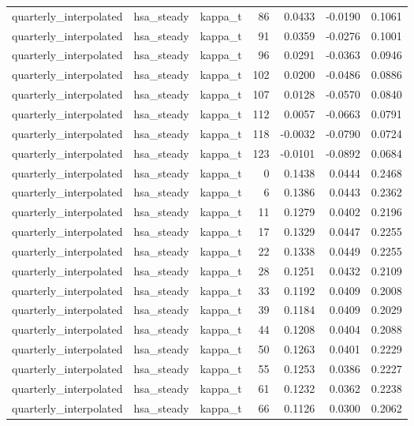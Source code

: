 \begin{tabular}{lllrrrr}
quarterly\_interpolated & hsa\_steady & kappa\_t & 86 & 0.0433 & -0.0190 & 0.1061 \\
quarterly\_interpolated & hsa\_steady & kappa\_t & 91 & 0.0359 & -0.0276 & 0.1001 \\
quarterly\_interpolated & hsa\_steady & kappa\_t & 96 & 0.0291 & -0.0363 & 0.0946 \\
quarterly\_interpolated & hsa\_steady & kappa\_t & 102 & 0.0200 & -0.0486 & 0.0886 \\
quarterly\_interpolated & hsa\_steady & kappa\_t & 107 & 0.0128 & -0.0570 & 0.0840 \\
quarterly\_interpolated & hsa\_steady & kappa\_t & 112 & 0.0057 & -0.0663 & 0.0791 \\
quarterly\_interpolated & hsa\_steady & kappa\_t & 118 & -0.0032 & -0.0790 & 0.0724 \\
quarterly\_interpolated & hsa\_steady & kappa\_t & 123 & -0.0101 & -0.0892 & 0.0684 \\
quarterly\_interpolated & hsa\_steady & kappa\_t & 0 & 0.1438 & 0.0444 & 0.2468 \\
quarterly\_interpolated & hsa\_steady & kappa\_t & 6 & 0.1386 & 0.0443 & 0.2362 \\
quarterly\_interpolated & hsa\_steady & kappa\_t & 11 & 0.1279 & 0.0402 & 0.2196 \\
quarterly\_interpolated & hsa\_steady & kappa\_t & 17 & 0.1329 & 0.0447 & 0.2255 \\
quarterly\_interpolated & hsa\_steady & kappa\_t & 22 & 0.1338 & 0.0449 & 0.2255 \\
quarterly\_interpolated & hsa\_steady & kappa\_t & 28 & 0.1251 & 0.0432 & 0.2109 \\
quarterly\_interpolated & hsa\_steady & kappa\_t & 33 & 0.1192 & 0.0409 & 0.2008 \\
quarterly\_interpolated & hsa\_steady & kappa\_t & 39 & 0.1184 & 0.0409 & 0.2029 \\
quarterly\_interpolated & hsa\_steady & kappa\_t & 44 & 0.1208 & 0.0404 & 0.2088 \\
quarterly\_interpolated & hsa\_steady & kappa\_t & 50 & 0.1263 & 0.0401 & 0.2229 \\
quarterly\_interpolated & hsa\_steady & kappa\_t & 55 & 0.1253 & 0.0386 & 0.2227 \\
quarterly\_interpolated & hsa\_steady & kappa\_t & 61 & 0.1232 & 0.0362 & 0.2238 \\
quarterly\_interpolated & hsa\_steady & kappa\_t & 66 & 0.1126 & 0.0300 & 0.2062 \\

\end{tabular}
